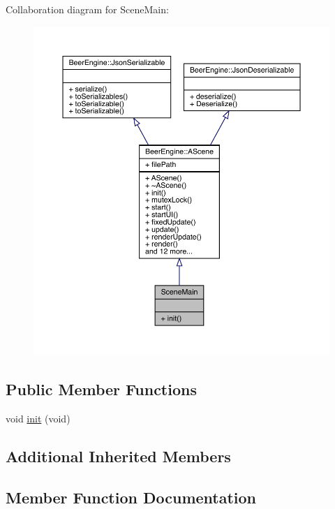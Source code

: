 Collaboration diagram for Scene\+Main\+:\nopagebreak
\begin{figure}[H]
\begin{center}
\leavevmode
\includegraphics[width=350pt]{class_scene_main__coll__graph}
\end{center}
\end{figure}
\subsection*{Public Member Functions}
\begin{DoxyCompactItemize}
\item 
void \mbox{\hyperlink{class_scene_main_a4406dc5cf9807edcf360ba416de928e2}{init}} (void)
\end{DoxyCompactItemize}
\subsection*{Additional Inherited Members}


\subsection{Member Function Documentation}
\mbox{\label{class_scene_main_a4406dc5cf9807edcf360ba416de928e2}} 
